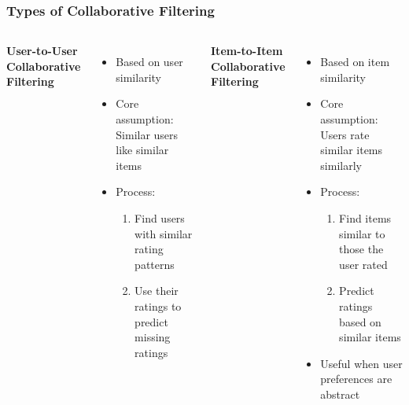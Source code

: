 \documentclass{beamer}
\begin{document}
\begin{frame}
\frametitle{Types of Collaborative Filtering}
\begin{columns}
\textbf{User-to-User Collaborative Filtering}
\begin{itemize}
    \item Based on user similarity
    \item Core assumption: Similar users like similar items
    \item Process:
    \begin{enumerate}
        \item Find users with similar rating patterns
        \item Use their ratings to predict missing ratings
    \end{enumerate}
\end{itemize}

\textbf{Item-to-Item Collaborative Filtering}
\begin{itemize}
    \item Based on item similarity
    \item Core assumption: Users rate similar items similarly
    \item Process:
    \begin{enumerate}
        \item Find items similar to those the user rated
        \item Predict ratings based on similar items
    \end{enumerate}
    \item Useful when user preferences are abstract
\end{itemize}
\end{columns}
\end{frame}
\end{document}
